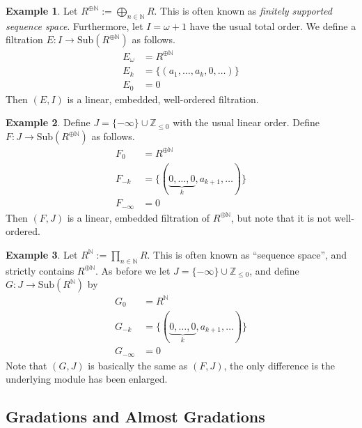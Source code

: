 \documentclass[oneside,11pt]{amsart}
\newcommand{\zz}{\ensuremath{\mathbb{Z}}}
\newcommand{\nn}{\ensuremath{\mathbb{N}}}
\newcommand{\Sub}{\ensuremath{\text{Sub}}}
\theoremstyle{definition}
\newtheorem{example}{Example}
\newtheorem{proof techniques}{Proof Techniques}
\begin{document}
\begin{example}
Let $R^{\oplus \nn} := \bigoplus_{n \in \nn} R$. This is often known as \emph{finitely supported sequence space}. Furthermore, let $I = \omega + 1$ have the usual total order. We define a filtration $E : I \to \Sub(R^{\oplus \nn})$ as follows. 
\begin{align*}
 E_{\omega} &= R^{\oplus \nn}
\\ E_k &= \{ (a_1, \ldots, a_k, 0 , \ldots ) \}
\\ E_{0} &= 0
\end{align*}
Then $(E , I)$ is a linear, embedded, well-ordered filtration. 
\end{example}



\begin{example}
Define $J = \{ -\infty \} \cup \zz_{\leq 0}$ with the usual linear order. Define $F : J \to \Sub(R^{\oplus \nn})$ as follows.  
\begin{align*}
F_0 & = R^{\oplus \nn}
\\ F_{-k} &= \{ (\underbrace{0 , \ldots , 0}_{k} , a_{k + 1}, \ldots ) \} 
\\ F_{-\infty} &= 0
\end{align*}
Then $(F , J)$ is a linear, embedded filtration of $R^{\oplus \nn}$, but note that it is not well-ordered.
\end{example}



\begin{example}
Let $R^{\nn} := \prod_{n \in \nn} R$. This is often known as ``sequence space'', and strictly contains $R^{\oplus \nn}$. As before we let $J = \{ -\infty \} \cup \zz_{\leq 0}$, and define $G : J \to \Sub(R^{\nn})$ by
\begin{align*}
G_0 & = R^{\nn}
\\ G_{-k} &= \{ (\underbrace{0 , \ldots , 0}_{k} , a_{k + 1}, \ldots ) \} 
\\ G_{-\infty} &= 0
\end{align*}
Note that $(G, J)$ is basically the same as $(F, J)$, the only difference is the underlying module has been enlarged. 
\end{example}


\subsection{Gradations and Almost Gradations}
\end{document}
